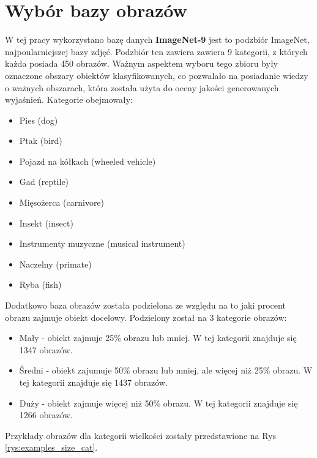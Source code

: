 \section*{Wybór bazy obrazów}

W tej pracy wykorzystano bazę danych \textbf{ImageNet-9} jest to podzbiór ImageNet, najpoularniejszej bazy zdjęć.
Podzbiór ten zawiera zawiera 9 kategorii, z których każda posiada 450 obrazów.
Ważnym aspektem wyboru tego zbioru były oznaczone obszary obiektów klasyfikowanych, co pozwalało na posiadanie wiedzy o ważnych obszarach, która została użyta do oceny jakości generowanych wyjaśnień.
Kategorie obejmowały:
\begin{itemize}
	\item Pies (dog)
	\item Ptak (bird)
	\item Pojazd na kółkach (wheeled vehicle)
	\item Gad (reptile)
	\item Mięsożerca (carnivore)
	\item Insekt (insect)
	\item Instrumenty muzyczne (musical instrument)
	\item Naczelny (primate)
	\item Ryba (fish)
\end{itemize}

Dodatkowo baza obrazów została podzielona ze względu na to jaki procent obrazu zajmuje obiekt docelowy.
Podzielony został na 3 kategorie obrazów:
\begin{itemize}
	\item Mały - obiekt zajmuje 25\% obrazu lub mniej. W tej kategorii znajduje się 1347 obrazów.
	\item Średni - obiekt zajumuje 50\% obrazu lub mniej, ale więcej niż 25\% obrazu. W tej kategorii znajduje się 1437 obrazów.
	\item Duży - obiekt zajmuje więcej niż 50\% obrazu. W tej kategorii znajduje się 1266 obrazów.
\end{itemize}

Przykłady obrazów dla kategorii wielkości zostały przedstawione na Rys \ref{rys:examples_size_cat}.

